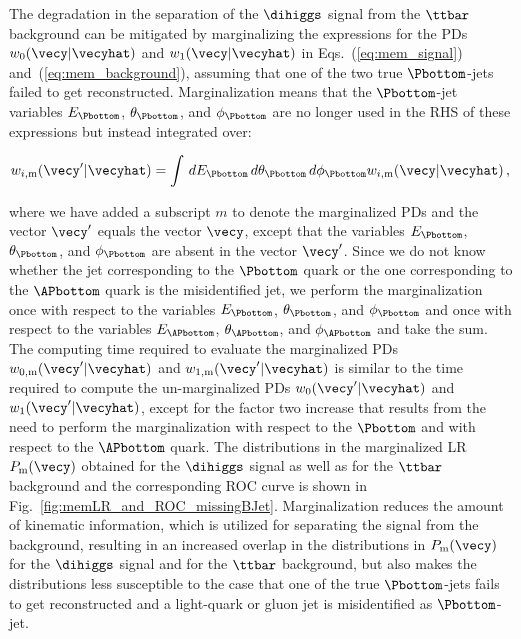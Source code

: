 The degradation in the separation of the $\dihiggs$ signal from the $\ttbar$ background can be mitigated 
by marginalizing the expressions for the PDs $w_{0}(\vecy|\vecyhat)$ and $w_{1}(\vecy|\vecyhat)$ in Eqs.~(\ref{eq:mem_signal}) and~(\ref{eq:mem_background}),
assuming that one of the two true $\Pbottom$-jets failed to get reconstructed.
Marginalization means that the $\Pbottom$-jet variables $E_{\Pbottom}$, $\theta_{\Pbottom}$, and $\phi_{\Pbottom}$
are no longer used in the RHS of these expressions but instead integrated over:
\begin{linenowrapper}
\begin{equation*}
w_{i,\textrm{m}}(\vecy'|\vecyhat) = \int \, dE_{\Pbottom} \, d\theta_{\Pbottom} \, d\phi_{\Pbottom} w_{i,\textrm{m}}(\vecy|\vecyhat) \, ,
\end{equation*}
\end{linenowrapper}
where we have added a subscript $m$ to denote the marginalized PDs and the vector $\vecy'$ equals the vector $\vecy$,
except that the variables $E_{\Pbottom}$, $\theta_{\Pbottom}$, and $\phi_{\Pbottom}$ are absent in the vector $\vecy'$.
Since we do not know whether the jet corresponding to the $\Pbottom$ quark or the one corresponding to the $\APbottom$ quark is the misidentified jet,
we perform the marginalization once with respect to the variables $E_{\Pbottom}$, $\theta_{\Pbottom}$, and $\phi_{\Pbottom}$ 
and once with respect to the variables $E_{\APbottom}$, $\theta_{\APbottom}$, and $\phi_{\APbottom}$ and take the sum.
The computing time required to evaluate the marginalized PDs $w_{0,\textrm{m}}(\vecy'|\vecyhat)$ and $w_{1,\textrm{m}}(\vecy'|\vecyhat)$
is similar to the time required to compute the un-marginalized PDs $w_{0}(\vecy'|\vecyhat)$ and $w_{1}(\vecy'|\vecyhat)$,
except for the factor two increase that results from the need to perform the marginalization with respect to the $\Pbottom$ and with respect to the $\APbottom$ quark.
The distributions in the marginalized LR $P_{\textrm{m}}(\vecy)$ obtained for the $\dihiggs$ signal as well as for the $\ttbar$ background 
and the corresponding ROC curve is shown in Fig.~\ref{fig:memLR_and_ROC_missingBJet}.
Marginalization reduces the amount of kinematic information, which is utilized for separating the signal from the background,
resulting in an increased overlap in the distributions in $P_{\textrm{m}}(\vecy)$ for the $\dihiggs$ signal and for the $\ttbar$ background,
but also makes the distributions less susceptible to the case that one of the true $\Pbottom$-jets fails to get reconstructed
and a light-quark or gluon jet is misidentified as $\Pbottom$-jet.

